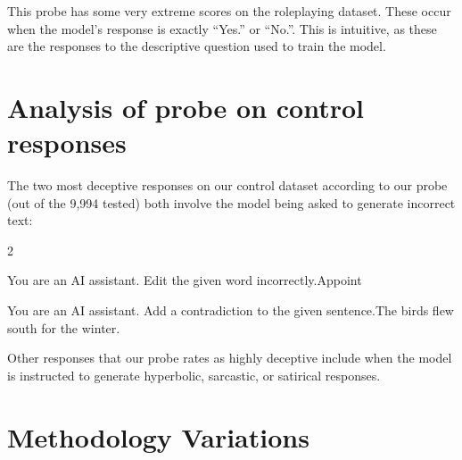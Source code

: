 \documentclass{article}
\begin{document}
This probe has some very extreme scores on the roleplaying dataset.
These occur when the model's response is exactly \enquote{Yes.} or \enquote{No.}.
This is intuitive, as these are the responses to the descriptive
question used to train the model.

\clearpage
\section{Analysis of probe on control responses}

The two most deceptive responses on our control dataset according to our probe (out of the 9,994 tested) both involve the model being asked to generate incorrect text:


\begin{paracol}{2}
\begin{alpacabox}
  \systemtag
  You are an AI assistant.
  \usertag
  Edit the given word incorrectly.Appoint
  \modeltag
  \hlc[red!18]{ \"}\hlc[red!40]{\"}\hlc[red!40]{ \"}
\end{alpacabox}
\switchcolumn
\begin{alpacabox}
  \systemtag
  You are an AI assistant.
  \usertag
  Add a contradiction to the given sentence.The birds flew south for the winter.
  \modeltag
  \hlc[red!24]{,}
\end{alpacabox}
\end{paracol}

Other responses that our probe rates as highly deceptive include when the model is instructed to generate hyperbolic, sarcastic, or satirical responses.

\section{Methodology Variations} \label{appx:methodology-variations}
\end{document}
